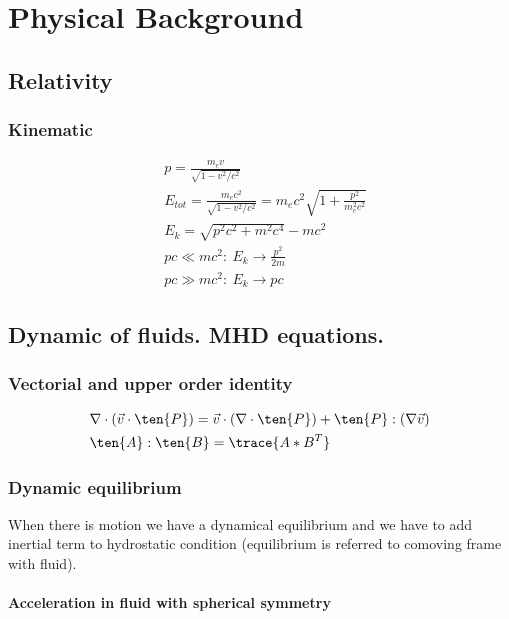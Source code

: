 \documentclass[oneside,12pt,fleqn]{memoir}
\begin{document}
\part{Physical Background}


\chapter{Relativity}
\PartialToc

\section{Kinematic}

\begin{align*}
&p=\frac{m_ev}{\sqrt{1-v^2/c^2}}\\
&E_{tot}=\frac{m_ec^2}{\sqrt{1-v^2/c^2}}=m_ec^2\sqrt{1+\frac{p^2}{m_e^2c^2}}\\
&E_k=\sqrt{p^2c^2+m^2c^4}-mc^2\\
&pc\ll mc^2:\ E_k\to\frac{p^2}{2m}\\
&pc\gg mc^2:\ E_k\to pc
\end{align*}


\chapter{Dynamic of fluids. MHD equations.}
\PartialToc

\section{Vectorial and upper order identity}

\begin{align*}
&\nabla\cdot(\vec{v}\cdot\ten{P})=\vec{v}\cdot(\nabla\cdot\ten{P})+\ten{P}:(\nabla\vec{v})\\
&\ten{A}:\ten{B}=\trace{A*B^T}
\end{align*}

\section{Dynamic equilibrium}

When there is motion we have a dynamical equilibrium and we have to add inertial term to hydrostatic condition (equilibrium is referred to comoving frame with fluid).

\subsection{Acceleration in fluid with spherical symmetry}
\end{document}
